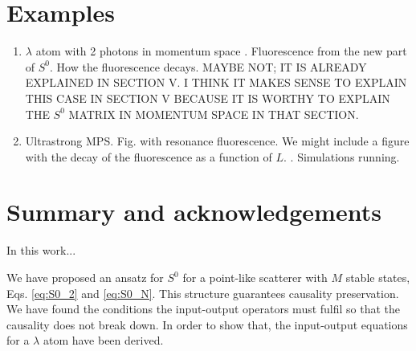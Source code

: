 \documentclass[notitlepage, prx, preprint, amsmath,superscriptaddress,amssymb]{revtex4-1}
\begin{document}
%

\section{Examples}

{\color{blue}
\begin{enumerate}
\item $\lambda$ atom with 2 photons in momentum space \cite{Xu2016}. Fluorescence from the new part of $S^0$. How the fluorescence decays. MAYBE NOT; IT IS ALREADY EXPLAINED IN SECTION V. I THINK IT MAKES SENSE TO EXPLAIN THIS CASE IN SECTION V BECAUSE IT IS WORTHY TO EXPLAIN THE $S^0$ MATRIX IN MOMENTUM SPACE IN THAT SECTION.
\item Ultrastrong MPS. Fig. with resonance fluorescence. We might include a figure with the decay of the fluorescence as a function of $L$. \cite{Sanchez-Burillo2014,Sanchez-Burillo2015}. Simulations running.
\end{enumerate}
}

\section{Summary and acknowledgements}

In this work...

We have proposed an ansatz for $S^0$ for a point-like scatterer with $M$ stable states, Eqs. \eqref{eq:S0_2} and \eqref{eq:S0_N}. This structure guarantees causality preservation. We have found the conditions the input-output operators must fulfil so that the causality does not break down. In order to show that, the input-output equations for a $\lambda$ atom have been derived.
\end{document}
